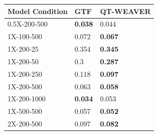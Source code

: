 \documentclass[10pt,a4paper]{article}
\newcommand{\addb}[1]{{\color{red} #1}}
\begin{document}
\begin{table}[h!]
    \begin{tabular}{|C{3cm}|C{3cm}|C{3cm}|}
        \hline
        \textbf{Model Condition} & \textbf{GTF} & \textbf{QT-WEAVER} \\
        \hline
        0.5X-200-500 & \textbf{0.038} & 0.044 \\
        \hline
        1X-100-500 & 0.072 & \textbf{0.067} \\
        \hline
        1X-200-25 & 0.354 & \textbf{0.345} \\
        \hline
        1X-200-50 & 0.3 & \textbf{0.287} \\
        \hline
        1X-200-250 & 0.118 & \textbf{0.097} \\
        \hline
        1X-200-500 & 0.063 & \textbf{0.058} \\
        \hline
        1X-200-1000 & \textbf{0.034} & 0.053 \\
        \hline
        1X-500-500 & 0.057 & \textbf{0.052} \\
        \hline
        2X-200-500 & 0.097 & \textbf{0.082} \\
        \hline
    \end{tabular}
\end{table}

\end{document}
